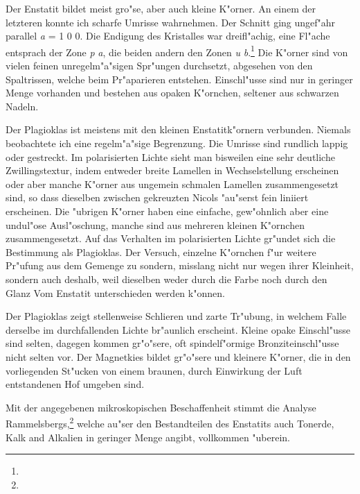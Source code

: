 \documentclass[a4paper, 11pt, oneside, polutonikogreek, german]{article}
\begin{document}
Der Enstatit bildet meist gro"se, aber auch kleine K"orner. An einem der letzteren konnte ich scharfe Umrisse wahrnehmen. Der Schnitt ging ungef"ahr parallel \emph{a} = 1 0 0. Die Endigung des Kristalles war dreifl"achig, eine Fl"ache entsprach der Zone \emph{p} \emph{a},  die beiden andern den Zonen \emph{u} \emph{b}.\footnote{} Die K"orner sind von vielen feinen unregelm"a"sigen Spr"ungen durchsetzt, abgesehen von den Spaltrissen, welche beim Pr"aparieren entstehen. Einschl"usse sind nur in geringer Menge vorhanden und bestehen aus opaken K"ornchen, seltener aus schwarzen Nadeln.

Der Plagioklas ist meistens mit den kleinen Enstatitk"ornern verbunden. Niemals beobachtete ich eine regelm"a"sige Begrenzung. Die Umrisse sind rundlich lappig oder gestreckt. Im polarisierten Lichte sieht man bisweilen eine sehr deutliche Zwillingstextur, indem entweder breite Lamellen in Wechselstellung erscheinen oder aber manche K"orner aus ungemein schmalen Lamellen zusammengesetzt sind, so dass dieselben zwischen gekreuzten Nicols "au"serst fein liniiert erscheinen. Die "ubrigen K"orner haben eine einfache, gew"ohnlich aber eine undul"ose Ausl"oschung, manche sind aus mehreren kleinen K"ornchen zusammengesetzt. Auf das Verhalten im polarisierten Lichte gr"undet sich die Bestimmung als Plagioklas. Der Versuch, einzelne K"ornchen f"ur weitere Pr"ufung aus dem Gemenge zu sondern, misslang nicht nur wegen ihrer Kleinheit, sondern auch deshalb, weil dieselben weder durch die Farbe noch durch den Glanz Vom Enstatit unterschieden werden k"onnen.

Der Plagioklas zeigt stellenweise Schlieren und zarte Tr"ubung, in welchem Falle derselbe im durchfallenden Lichte br"aunlich erscheint. Kleine opake Einschl"usse sind selten, dagegen kommen gr"o"sere, oft spindelf"ormige Bronziteinschl"usse nicht selten vor. Der Magnetkies bildet gr"o"sere und kleinere K"orner, die in den vorliegenden St"ucken von einem braunen, durch Einwirkung der Luft entstandenen Hof umgeben sind.

Mit der angegebenen mikroskopischen Beschaffenheit stimmt die Analyse Rammelsbergs,\footnote{} welche au"ser den Bestandteilen des Enstatits auch Tonerde, Kalk and Alkalien in geringer Menge angibt, vollkommen "uberein.
\end{document}
